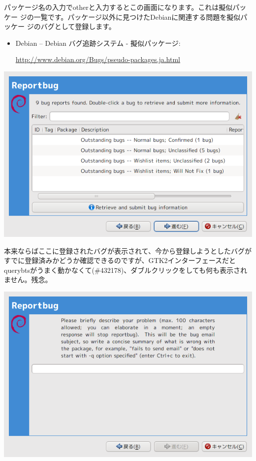 \documentclass[mingoth,a4paper]{jsarticle}
\begin{document}
パッケージ名の入力でotherと入力するとこの画面になります。これは擬似パッケー
ジの一覧です。パッケージ以外に見つけたDebianに関連する問題を擬似パッケー
ジのバグとして登録します。

\begin{itemize}
 \item Debian -- Debian バグ追跡システム - 擬似パッケージ:

\url{http://www.debian.org/Bugs/pseudo-packages.ja.html}

\end{itemize}

\includegraphics[scale=0.5]{image200909/reportbug-3.png}

本来ならばここに登録されたバグが表示されて、今から登録しようとしたバグが
すでに登録済みかどうか確認できるのですが、GTK2インターフェースだと
querybtsがうまく動かなくて(\#432178)、ダブルクリックをしても何も表示され
ません。残念。

\includegraphics[scale=0.5]{image200909/reportbug-4.png}
\end{document}
